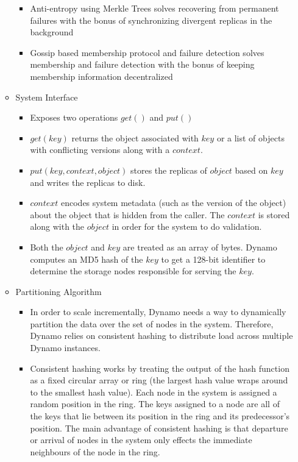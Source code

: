 \documentclass[a4paper]{article}
\begin{document}
\begin{itemize}
\begin{itemize}
\begin{itemize}
\item Anti-entropy using Merkle Trees solves recovering from permanent failures with the bonus of synchronizing divergent replicas in the background

\item Gossip based membership protocol and failure detection solves membership and failure detection with the bonus of keeping membership information decentralized
\end{itemize}

\item System Interface
\begin{itemize}
\item Exposes two operations $get()$ and $put()$

\item $get(key)$ returns the object associated with $key$ or a list of objects with conflicting versions along with a $context$.

\item $put(key, context, object)$ stores the replicas of $object$ based on $key$ and writes the replicas to disk. 

\item $context$ encodes system metadata (such as the version of the object) about the object that is hidden from the caller. The $context$ is stored along with the $object$ in order for the system to do validation.

\item Both the $object$ and $key$ are treated as an array of bytes. Dynamo computes an MD5 hash of the $key$ to get a 128-bit identifier to determine the storage nodes responsible for serving the $key$. 
\end{itemize}

\item Partitioning Algorithm
\begin{itemize}
\item In order to scale incrementally, Dynamo needs a way to dynamically partition the data over the set of nodes in the system. Therefore, Dynamo relies on consistent hashing to distribute load across multiple Dynamo instances.

\item Consistent hashing works by treating the output of the hash function as a fixed circular array or ring (the largest hash value wraps around to the smallest hash value). Each node in the system is assigned a random position in the ring. The keys assigned to a node are all of the keys that lie between its position in the ring and its predecessor's position. The main advantage of consistent hashing is that departure or arrival of nodes in the system only effects the immediate neighbours of the node in the ring.


\end{itemize}
\end{itemize}
\end{itemize}
\end{document}
